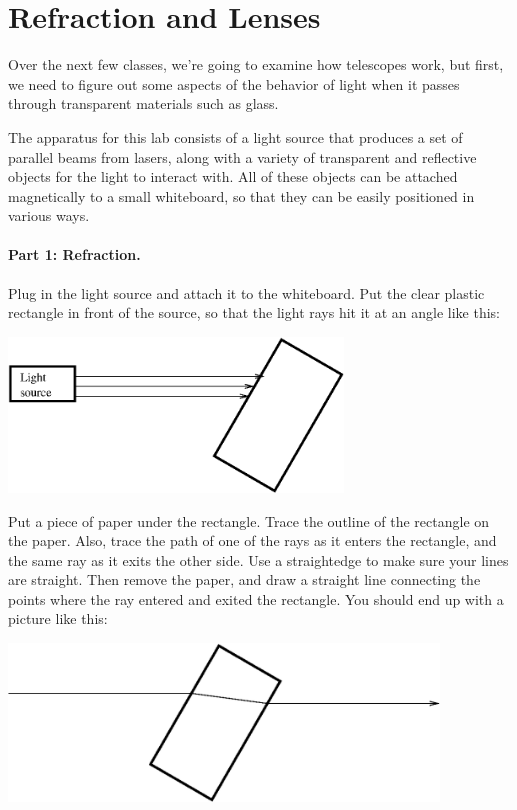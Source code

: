 \section{Refraction and Lenses}

\makelabheader 

Over the next few classes, we're going to examine how telescopes work,
but first, we need to figure out some aspects of the behavior of light
when it passes through transparent materials such as glass.

The apparatus for this lab consists of a light source that produces a set
of parallel beams from lasers, along with a variety of transparent and
reflective objects for the light to interact with.  All of these objects
can be attached magnetically to a small whiteboard, so that they can be
easily positioned in various ways.

\paragraph{Part 1: Refraction.}
Plug in the light source and attach it to the whiteboard.  Put
the clear plastic rectangle in front of the source, so that
the light rays hit it at an angle like this:

\answerspace{0.1in}
\centerline{\includegraphics[width=3.5in]{lenses1/lensfig1.eps}}


Put a piece of paper under the rectangle.  Trace the outline of the rectangle
on the paper.  Also, trace the path of one of the rays as it enters
the rectangle, and the same ray as it exits the other side.  Use
a straightedge to make sure your lines are straight.
Then remove the paper, and draw a straight line connecting the points
where the ray entered and exited the rectangle. 
You should end up
with a picture like this:

\answerspace{0.1in}
\centerline{\includegraphics[width=4.5in]{lenses1/lensfig2.eps}}



